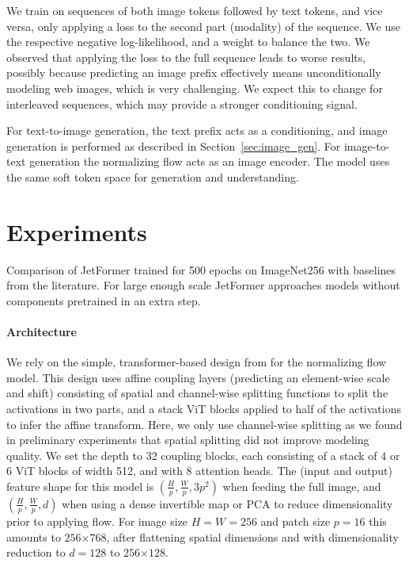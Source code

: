 \documentclass{article} %
\begin{document}
We train on sequences of both image tokens followed by text tokens, and vice versa, only applying a loss to the second part (modality) of the sequence. We use the respective negative log-likelihood, and a weight to balance the two. We observed that applying the loss to the full sequence leads to worse results, possibly because predicting an image prefix effectively means unconditionally modeling web images, which is very challenging. We expect this to change for interleaved sequences, which may provide a stronger conditioning signal.

For text-to-image generation, the text prefix acts as a conditioning, and image generation is performed as described in Section~\ref{sec:image_gen}. For image-to-text generation the normalizing flow acts as an image encoder. The model uses the same soft token space for generation and understanding.

\section{Experiments}


\begin{table}[t]
    \caption{Comparison of JetFormer trained for 500 epochs on ImageNet256 with baselines from the literature. For large enough scale JetFormer approaches models without components pretrained in an extra step.}
    \centering
    
    \label{tab:imagenet_main}
\end{table}

\label{sec:results}

\paragraph{Architecture} We rely on the simple, transformer-based design from \citep{jet2024} for the normalizing flow model. This design uses affine coupling layers (predicting an element-wise scale and shift) consisting of spatial and channel-wise splitting functions to split the activations in two parts, and a stack ViT blocks \citep{dosovitskiy2020image} applied to half of the activations to infer the affine transform. Here, we only use channel-wise splitting as we found in preliminary experiments that spatial splitting did not improve modeling quality. We set the depth to 32 coupling blocks, each consisting of a stack of 4 or 6 ViT blocks of width 512, and with 8 attention heads. The (input and output) feature shape for this model is $(\frac{H}{p}, \frac{W}{p}, 3p^2)$ when feeding the full image, and $(\frac{H}{p}, \frac{W}{p}, d)$ when using a dense invertible map or PCA to reduce dimensionality prior to applying flow. For image size $H=W=256$ and patch size $p=16$ this amounts to $256$$\times$$768$, after flattening spatial dimensions and with dimensionality reduction to $d=128$ to $256$$\times$$128$.
\end{document}
